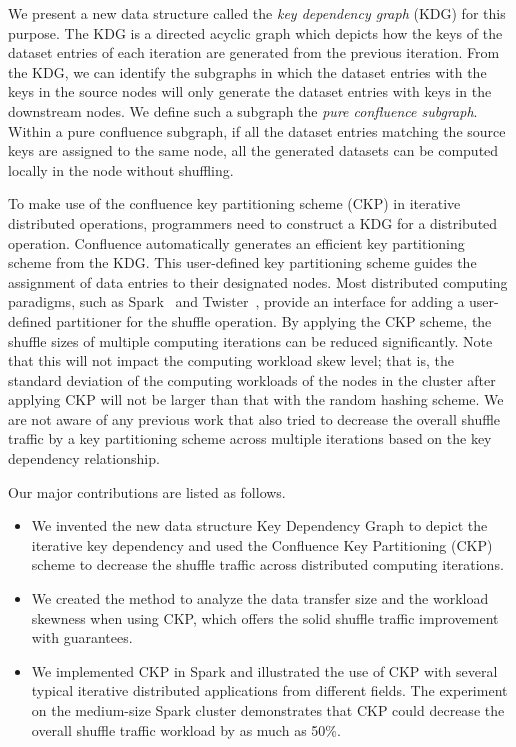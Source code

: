 \documentclass[10pt,journal,compsoc]{IEEEtran}
\begin{document}
We present a new data structure called the \emph{key dependency graph} (KDG) for this purpose.
The KDG is a directed acyclic graph which depicts how the keys of the
dataset entries of each iteration are generated from the previous iteration.
From the KDG, we can identify the subgraphs in which the dataset
entries with the keys in the source nodes will only generate the dataset
entries with keys in the downstream nodes. We define such a subgraph
the \emph{pure confluence subgraph}.
Within a pure confluence subgraph, if all the dataset entries matching
the source keys are assigned to the same node, all the generated
datasets can be computed locally in the node without shuffling.

To make use of the confluence key partitioning scheme (CKP) in iterative distributed operations, 
programmers need to construct a KDG for a distributed operation. 
Confluence automatically generates an efficient key partitioning 
scheme from the KDG. 
This user-defined key partitioning scheme guides the assignment of data entries 
to their designated nodes. 
Most distributed computing paradigms, such as Spark~\cite{zaharia2012resilient} and Twister~\cite{ekanayake2010twister},
provide an interface for adding a user-defined partitioner for the shuffle
operation.
By applying the CKP scheme, the shuffle sizes of multiple computing
iterations can be reduced significantly. %
Note that this will not impact the computing workload skew level; that is,
the standard deviation of the computing workloads of the
nodes in the cluster after applying CKP will not be larger than that
with the random hashing scheme.
We are not aware of any previous work
that also tried to decrease the overall
shuffle traffic by a key partitioning scheme across multiple
iterations based on the
key dependency relationship.

Our major contributions are listed as follows.
\begin{itemize}
\setlength{\itemsep}{0pt}
\setlength{\parskip}{0pt}
\setlength{\parsep}{0pt}
\item We invented the new data structure Key Dependency Graph to depict the iterative key dependency
and used the Confluence Key Partitioning (CKP) scheme to decrease the shuffle traffic
across distributed computing iterations.

\item We created the method to analyze the data transfer size and the workload skewness when using CKP, which offers the solid shuffle traffic improvement with guarantees. 

\item We implemented CKP in Spark and illustrated the use of CKP with several typical iterative distributed applications from different fields. 
The experiment on the medium-size Spark cluster demonstrates that CKP could decrease the overall shuffle traffic workload by as much as 50\%.  
\end{itemize}
\end{document}
